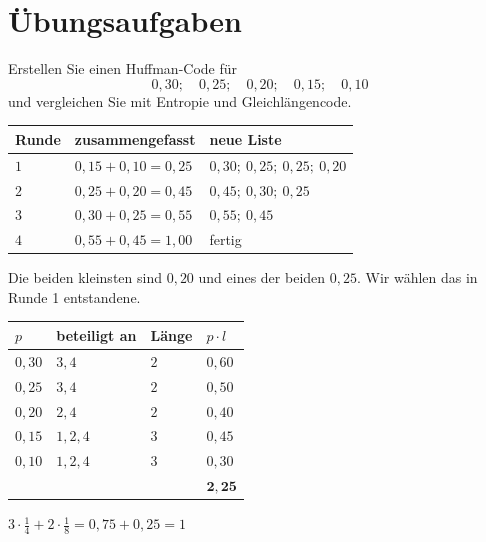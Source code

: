 \section{Übungsaufgaben}

\begin{aufgabe}
Erstellen Sie einen Huffman-Code für
\[ 0{,}30;\quad 0{,}25;\quad 0{,}20;\quad 0{,}15;\quad 0{,}10 \]
und vergleichen Sie mit Entropie und Gleichlängencode.

\loesung
{}
\begin{center}
{\small
\renewcommand{\arraystretch}{1.48}
\begin{tabular}{@{}P{1.2cm}P{3.0cm}P{3.4cm}@{}}
\toprule
\textbf{Runde} & \textbf{zusammengefasst} & \textbf{neue Liste}\\
\midrule
$1$ & $0{,}15+0{,}10 = 0{,}25$ & $0{,}30;\ 0{,}25;\ 0{,}25;\ 0{,}20$\\
$2$ & $0{,}25+0{,}20 = 0{,}45$ & $0{,}45;\ 0{,}30;\ 0{,}25$\\
$3$ & $0{,}30+0{,}25 = 0{,}55$ & $0{,}55;\ 0{,}45$\\
$4$ & $0{,}55+0{,}45 = 1{,}00$ & fertig\\
\bottomrule
\end{tabular}}
\end{center}

 Die beiden kleinsten sind $0{,}20$ und eines der beiden $0{,}25$. Wir wählen das in Runde 1 entstandene.

\begin{center}
{\small
\renewcommand{\arraystretch}{1.48}
\begin{tabular}{@{}P{1.6cm}P{2.4cm}P{1.6cm}P{1.8cm}@{}}
\toprule
$p$ & \textbf{beteiligt an} & \textbf{Länge} & $p\cdot l$\\
\midrule
$0{,}30$ & $3,4$ & $2$ & $0{,}60$\\
$0{,}25$ & $3,4$ & $2$ & $0{,}50$\\
$0{,}20$ & $2,4$ & $2$ & $0{,}40$\\
$0{,}15$ & $1,2,4$ & $3$ & $0{,}45$\\
$0{,}10$ & $1,2,4$ & $3$ & $0{,}30$\\
\midrule
& & & $\mathbf{2{,}25}$\\
\bottomrule
\end{tabular}}
\end{center}

 $3\cdot\frac14 + 2\cdot\frac18 = 0{,}75+0{,}25 = 1$ \checkmark


\end{aufgabe}
